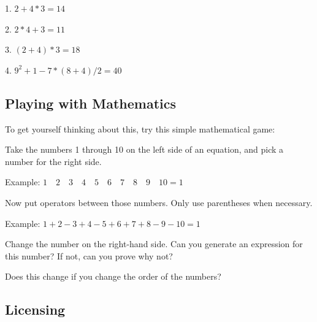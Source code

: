1. $2+4*3 = 14$  

2. $2*4+3 = 11$  

3. $(2+4)*3 = 18$  

4. $9^2 + 1 - 7*(8+4)/2 = 40$




\subsection{Playing with Mathematics}
\label{sss:play-a2f7}




To get yourself thinking about this, try this simple mathematical game:



Take the numbers 1 through 10 on the left side of an equation, and pick a number for the right side.



Example:
$1\hspace{1em}2\hspace{1em}3\hspace{1em}4\hspace{1em}5\hspace{1em}6\hspace{1em}7\hspace{1em}8\hspace{1em}9\hspace{1em}10
= 1 $



Now put operators between those numbers. Only use parentheses when necessary.



Example: $1 + 2 - 3 + 4 - 5 + 6 + 7 + 8 - 9 - 10 = 1$



Change the number on the right-hand side. Can you generate an expression for this number?
If not, can you prove why not?



Does this change if you change the order of the numbers?




\subsection{Licensing}
\label{sss:lice-73521}




